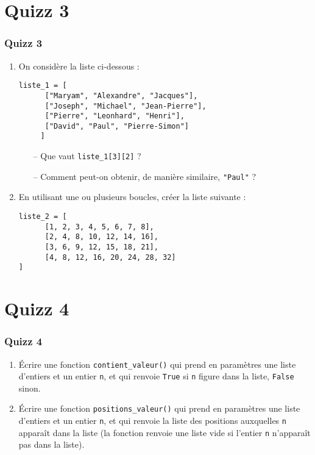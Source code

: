 \documentclass{beamer}
\begin{document}
\section{Quizz 3}

\begin{frame}[fragile]
  \frametitle{Quizz 3}
  \begin{enumerate}
    \item On considère la liste ci-dessous :
      \begin{verbatim}
liste_1 = [
      ["Maryam", "Alexandre", "Jacques"],
      ["Joseph", "Michael", "Jean-Pierre"],
      ["Pierre", "Leonhard", "Henri"],
      ["David", "Paul", "Pierre-Simon"]
     ]
      \end{verbatim}
      \begin{enumerate}
	\item[--] Que vaut \texttt{liste_1[3][2]} ?
	\item[--] Comment peut-on obtenir, de manière similaire, \texttt{"Paul"} ?
      \end{enumerate}
  \end{enumerate}
\end{frame}

\begin{frame}[fragile]
  \begin{enumerate}
    \setcounter{enumi}{1}
    \item En utilisant une ou plusieurs boucles, créer la liste suivante :
      \begin{verbatim}
liste_2 = [
      [1, 2, 3, 4, 5, 6, 7, 8],
      [2, 4, 8, 10, 12, 14, 16],
      [3, 6, 9, 12, 15, 18, 21],
      [4, 8, 12, 16, 20, 24, 28, 32]
]
      \end{verbatim}
  \end{enumerate}
\end{frame}

\section{Quizz 4}

\begin{frame}
  \frametitle{Quizz 4}
  \begin{enumerate}
    \item Écrire une fonction \texttt{contient_valeur()} qui prend en paramètres une liste d'entiers et un entier \texttt{n}, et qui renvoie \texttt{True} si \texttt{n} figure dans la liste, \texttt{False} sinon.
    \item Écrire une fonction \texttt{positions_valeur()} qui prend en paramètres une liste d'entiers et un entier \texttt{n}, et qui renvoie la liste des positions auxquelles \texttt{n} apparaît dans la liste (la fonction renvoie une liste vide si l'entier \texttt{n} n'apparaît pas dans la liste).
  \end{enumerate}
\end{frame}
\end{document}
